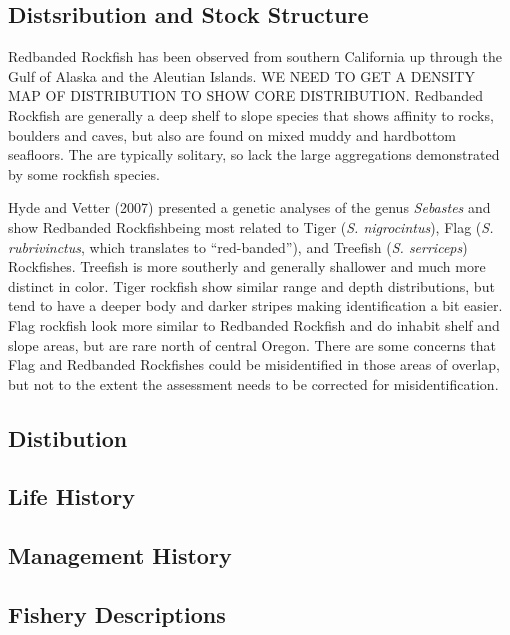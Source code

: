 \documentclass[
  letterpaper,
]{article}
\begin{document}
\subsection{Distsribution and Stock Structure}\label{sec-stock-id}

Redbanded Rockfish has been observed from southern California up through
the Gulf of Alaska and the Aleutian Islands. WE NEED TO GET A DENSITY
MAP OF DISTRIBUTION TO SHOW CORE DISTRIBUTION. Redbanded Rockfish are
generally a deep shelf to slope species that shows affinity to rocks,
boulders and caves, but also are found on mixed muddy and hardbottom
seafloors. The are typically solitary, so lack the large aggregations
demonstrated by some rockfish species.

Hyde and Vetter (2007) presented a genetic analyses of the genus
\emph{Sebastes} and show Redbanded Rockfishbeing most related to Tiger
(\emph{S. nigrocintus}), Flag (\emph{S. rubrivinctus}, which translates
to ``red-banded''), and Treefish (\emph{S. serriceps}) Rockfishes.
Treefish is more southerly and generally shallower and much more
distinct in color. Tiger rockfish show similar range and depth
distributions, but tend to have a deeper body and darker stripes making
identification a bit easier. Flag rockfish look more similar to
Redbanded Rockfish and do inhabit shelf and slope areas, but are rare
north of central Oregon. There are some concerns that Flag and Redbanded
Rockfishes could be misidentified in those areas of overlap, but not to
the extent the assessment needs to be corrected for misidentification.

\subsection{Distibution}\label{distibution}

\subsection{Life History}\label{life-history}

\subsection{Management History}\label{sec-management-history}

\subsection{Fishery Descriptions}\label{sec-fishery-descriptions}
\end{document}
